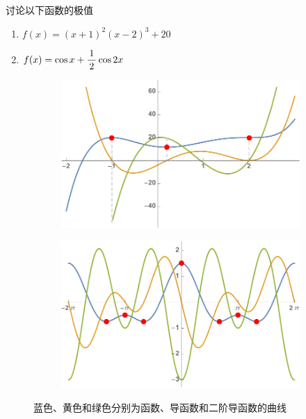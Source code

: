 \egz 讨论以下函数的极值
\begin{enumerate}[(1)]
  \setlength{\itemindent}{1cm}
  \item $f(x)=(x+1)^2(x-2)^3+20$
  \item $f(x)=\cos x+\displaystyle\frac{\,{1}\,}{\,{2}\,}\cos 2x$
\end{enumerate}
	
\begin{figure}[h]
	\centering
	\begin{subfigure}[t]{0.4\textwidth}
		\centering
		\includegraphics[width=\textwidth]
		{./Images/Ch03/x-1x25.pdf}
	\end{subfigure}\quad
	\begin{subfigure}[t]{0.4\textwidth}
		\centering
		\includegraphics[width=\textwidth]
		{./Images/Ch03/cx12c2x.pdf}
	\end{subfigure}
	\caption{蓝色、黄色和绿色分别为函数、导函数和二阶导函数的曲线}
	\label{fig:fdfddfx}
\end{figure}

